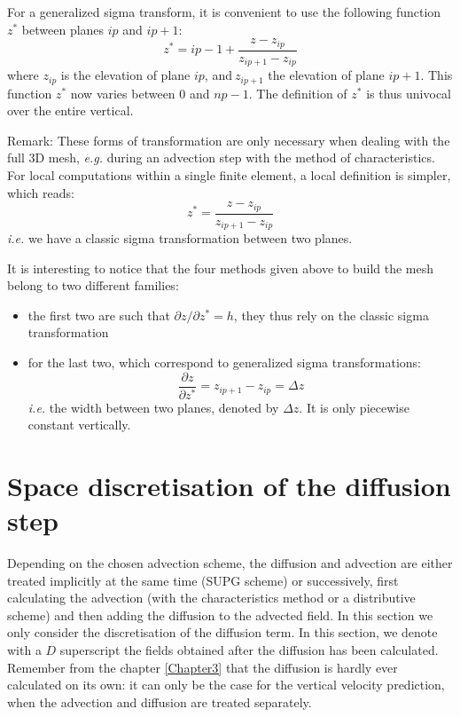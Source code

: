 For a generalized sigma transform, it is convenient to use the following
function $z^{\ast}$ between planes $ip$ and $ip+1$:%
\begin{equation}
z^{\ast}=ip-1+\dfrac{z-z_{ip}}{z_{ip+1}-z_{ip}}%
\end{equation}
where $z_{ip}$ is the elevation of plane $ip$, and$\ z_{ip+1}$ the elevation
of plane $ip+1$. This function $z^{\ast}$ now varies between 0 and $np-1$.
The definition of $z^{\ast}$ is thus univocal over the entire vertical.

\begin{CommentBlock}{Remark:}
These forms of transformation are only necessary when dealing with the full 3D
mesh, \textit{e.g.} during an advection step with the method of characteristics.
For local computations within a single finite element, a local definition is simpler, which reads:
\begin{equation}
z^{\ast}=\dfrac{z-z_{ip}}{z_{ip+1}-z_{ip}}
\end{equation}
\textit{i.e.} we have a classic sigma transformation between two planes.
\end{CommentBlock}

It is interesting to notice that the four methods given above to build the mesh
belong to two different families:
\begin{itemize}
\item the first two are such that $\partial z/\partial z^{\ast}=h$, they thus rely on the classic sigma transformation
\item for the last two, which correspond to generalized sigma transformations:
\begin{equation}
\dfrac{\partial z}{\partial z^{\ast}}=z_{ip+1}-z_{ip}=\Delta z
\end{equation}
\textit{i.e.} the width between two planes, denoted by $\Delta z$. It is only
piecewise constant vertically.
\end{itemize}




\section{\label{diffusion 3D}Space discretisation of the diffusion step}

Depending on the chosen advection scheme, the diffusion and advection
are either treated implicitly at the same time (SUPG scheme) or successively,
first calculating the advection (with the characteristics method or a
distributive scheme) and then adding the diffusion to the advected
field. In this section we only consider the discretisation of the
diffusion term. In this section, we denote with a $D$ superscript
the fields obtained after the diffusion has been calculated.
Remember from the chapter \ref{Chapter3} that the diffusion is
hardly ever calculated on its own: it can only be the case for the
vertical velocity prediction, when the advection and diffusion are treated
separately. \\

